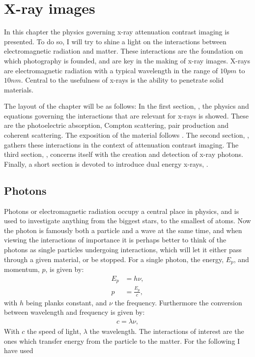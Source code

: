 \chapter{X-ray images}
\label{chap:x-ray}
In this chapter the physics governing x-ray attenuation contrast imaging is presented. To do so, I will try to shine a light on the interactions between electromagnetic radiation and matter.
These interactions are the foundation on which photography is founded, and are key in the making of x-ray images. X-rays are electromagnetic radiation with a typical wavelength in the range of $10pm$ to $10nm$. Central to the usefulness of x-rays is the ability to penetrate solid materials. 

The layout of the chapter will be as follows:
In the first section, , the physics and equations governing the interactions that are relevant for x-rays is showed.
These are the photoelectric absorption, Compton scattering, pair production and coherent scattering. The exposition of the material follows .
The second section, , gathers these interactions in the context of attenuation contrast imaging.
The third section, , concerns itself with the creation and detection of x-ray photons.
Finally, a short section is devoted to introduce dual energy x-rays, .
\section{Photons}
\label{sec:photons}
Photons or electromagnetic radiation occupy a central place in physics, and is used to investigate anything from the biggest stars, to the smallest of atoms.
Now the photon is famously both a particle and a wave at the same time, and when viewing the interactions of importance it is perhaps better to think of the photons as single particles undergoing interactions, which will let it either pass through a given material, or be stopped. 
For a single photon, the energy, $E_p$, and momentum, $p$, is given by:
\begin{align}
E_p &= h \nu, \\
p &= \frac{E_p}{c},
\end{align}
with $h$ being planks constant, and $\nu$ the frequency. Furthermore the conversion between wavelength and frequency is given by:
\begin{align}
c=\lambda \nu,
\end{align}
With $c$ the speed of light, $\lambda$ the wavelength. The interactions of interest are the ones which transfer energy from the particle to the matter. 
For the following I have used \cite[see][chap. 2]{knollRadiationDetectionMeasurement2000}

